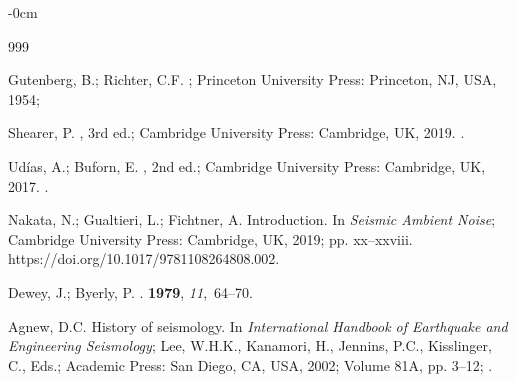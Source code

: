 \documentclass[sensors,article,accept,moreauthors,pdftex]{Definitions/mdpi}
\begin{document}
\begin{adjustwidth}{-\extralength}{0cm}


\begin{thebibliography}{999}

Gutenberg, B.; Richter, C.F.
; Princeton
  University Press: Princeton, NJ, USA,  1954;

Shearer, P.
, 3rd ed.; Cambridge University Press:
  Cambridge, UK,  2019.
.

Ud\'{i}as, A.; Buforn, E.
, 2nd ed.; Cambridge University Press: Cambridge, UK, %
 2017. .

Nakata, N.; Gualtieri, L.; Fichtner, A. Introduction.
\newblock In {\em Seismic Ambient Noise}; Cambridge University Press: Cambridge, UK, 2019; pp. xx--xxviii. {https://doi.org/10.1017/9781108264808.002}. %

Dewey, J.; Byerly, P.
.
 {\bf 1979},
  {\em 11},~64--70.
\newblock %

Agnew, D.C.
\newblock History of seismology. In {\em International Handbook of Earthquake
  and Engineering Seismology}; Lee, W.H.K., Kanamori, H., Jennins, P.C.,
  Kisslinger, C., Eds.; Academic Press: San Diego, CA, USA,  2002; Volume 81A,
  pp. 3--12; %
.


\end{thebibliography}
\end{adjustwidth}
\end{document}
